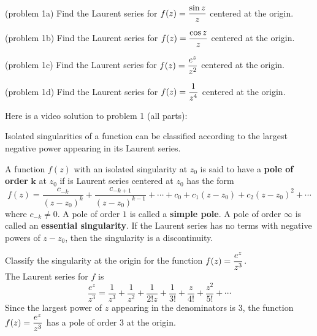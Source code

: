 \documentclass[handout]{ximera}
\begin{document}
\begin{problem}(problem 1a)
Find the Laurent series for $\displaystyle f(z) = \frac{\sin z}{z}$ centered at the origin.
\end{problem}

\begin{problem}(problem 1b)
Find the Laurent series for $\displaystyle f(z) = \frac{\cos z}{z}$ centered at the origin.
\end{problem}

\begin{problem}(problem 1c)
Find the Laurent series for $\displaystyle f(z) = \frac{e^z}{z^2}$ centered at the origin.
\end{problem}

\begin{problem}(problem 1d)
Find the Laurent series for $\displaystyle f(z) = \frac{1}{z^4}$ centered at the origin.
\end{problem}

Here is a video solution to problem 1 (all parts):\\
\begin{foldable}
\end{foldable}


Isolated singularities of a function can be classified according to the largest negative power appearing in
its Laurent series.

\begin{definition}
A function $f(z)$ with an isolated singularity at $z_0$ is said to have a \textbf{pole of order} $\boldsymbol{k}$ at $z_0$
if is Laurent series centered at $z_0$ has the form
\[
f(z) = \frac{c_{-k}}{(z-z_0)^k} +  \frac{c_{-k+1}}{(z-z_0)^{k-1}} + \cdots + c_0 + c_1(z-z_0) + c_2(z-z_0)^2 + \cdots
\]
where $c_{-k} \neq 0$.
A pole of order $1$ is called a {\bf simple pole}. A pole of order $\infty$ is called an {\bf essential singularity}.
If the Laurent series has no terms with negative powers of $z-z_0$, then the singularity is a discontinuity.
\end{definition}

\begin{example}[example 2]
Classify the singularity at the origin for the function $\displaystyle f(z) = \frac{e^z}{z^3}$.\\
The Laurent series for $f$ is
\[
\frac{e^z}{z^3} = \frac{1}{z^3} + \frac{1}{z^2} + \frac{1}{2!z} + \frac{1}{3!} + \frac{z}{4!} + \frac{z^2}{5!} + \cdots
\]
Since the largest power of $z$ appearing in the denominators is $3$, the function $\displaystyle f(z) = \frac{e^z}{z^3}$
has a pole of order $3$ at the origin.
\end{example}
\end{document}
